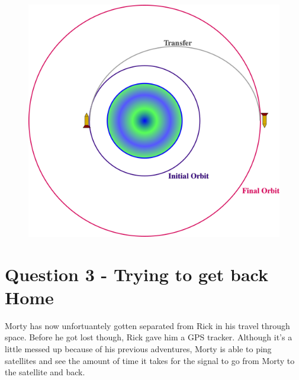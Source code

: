 \documentclass[a4paper, 12pt]{exam}
\begin{document}
	\begin{figure}[h!]
		\centering
		\includegraphics[scale = 0.8]{Q2_Transfer_Image.png}
	\end{figure}
	
	\pagebreak
	
	\section*{Question 3 - Trying to get back Home}
	Morty has now unfortuantely gotten separated from Rick in his travel through space. Before he got lost though, Rick gave him a GPS tracker. Although it's a little messed up because of his previous adventures, Morty is able to ping satellites and see the amount of time it takes for the signal to go from Morty to the satellite and back. 
	
\end{document}
